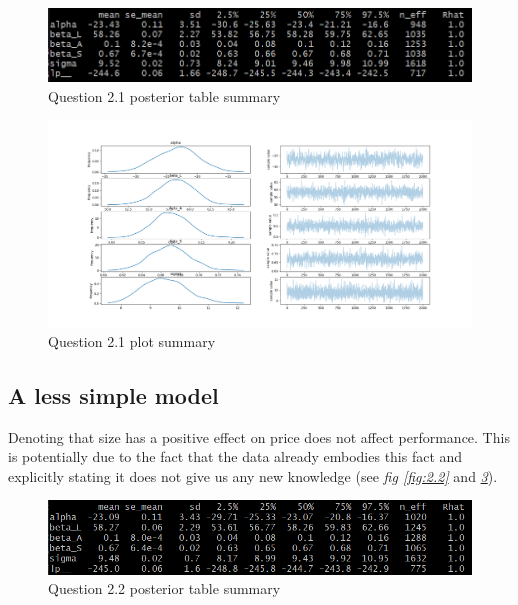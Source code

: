 \documentclass[11pt,a4paper]{article}
\begin{document}
  \begin{figure}[htb]
    \centering
      \includegraphics[width=\textwidth]{../q21/q21_summary_table.png}
      \caption{Question 2.1 posterior table summary}
    \label{tab:2.1}
  \end{figure}

  \begin{figure}[htb]
    \centering
      \includegraphics[width=\textwidth]{../q21/separated_features.png}
      \caption{Question 2.1 plot summary}
    \label{fig:2.1}
  \end{figure}


  \subsection{A less simple model}
  Denoting that size has a positive effect on price does not affect performance. This is potentially due to the fact that the data already embodies this fact and explicitly stating it does not give us any new knowledge (see \textit{fig \ref{fig:2.2}} and \textit{\ref{tab:2.2}}).

  \begin{figure}[htb]
    \centering
      \includegraphics[width=\textwidth]{../q22/q22_table_summary.png}
      \caption{Question 2.2 posterior table summary}
    \label{tab:2.2}
  \end{figure}
\end{document}
